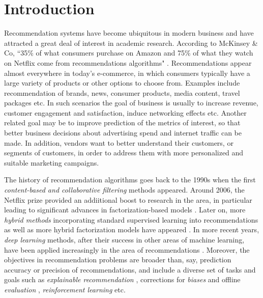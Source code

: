 \section{Introduction}

Recommendation systems have become ubiquitous in modern business and have attracted a great deal of interest in academic research.
According to McKinsey \& Co,
“35\% of what consumers purchase on Amazon and 75\% of what they watch on Netflix come from recommendations algorithms" 
\cite{mckinsey}.
Recommendations appear almost everywhere in today's e-commerce, in which consumers typically have a large variety of products or other
options to choose from. Examples include recommendation of brands, news, consumer products, media content, 
travel packages etc. In such scenarios the goal of business is usually to increase revenue,
customer engagement and satisfaction, induce networking effects etc. Another related goal may be to improve prediction of the metrics of interest, 
so that better business decisions about advertising spend and internet traffic can be made. In addition, vendors want to better understand their customers,
or segments of customers, in order to address them with more personalized and suitable marketing campaigns.

The history of recommendation algorithms goes back to the 1990s \cite{Tapestry, grouplens}
when the first {\em content-based and collaborative filtering} methods appeared.
Around 2006, the Netflix prize \cite{netflix} provided an addiitional boost to research in the area, in particular leading to significant advances in factorization-based models \cite{bell_lessons,koren2009matrix,SVD++,PMF}.
Later on, more {\em hybrid methods} incorporating standard supervised learning into recommendations as well as more hybrid factorization models have appeared
\cite{rendle,ffm,bpr,pairwise,multiverse}.
In more recent years, {\em deep learning} methods, after their success in other areas of machine learning, have been applied increasingly in the area of recommendations
\cite{PNN,cheng2016wide,lian2018xdeepfm,he2017neural,youtube,nvidia,survival}.
Moreover, the objectives in recommendation problems are broader than, say, prediction accuracy or precision of recommendations, and include a diverse set of tasks and goals such as 
{\em explainable recommendation} \cite{explainable,rl_explainable}, corrections for {\em biases} and offline {\em evaluation} \cite{mnar,offline,debiasing,counterfactual},
{\em reinforcement learning} \cite{rl_explainable,rl,rl_negative} etc.

